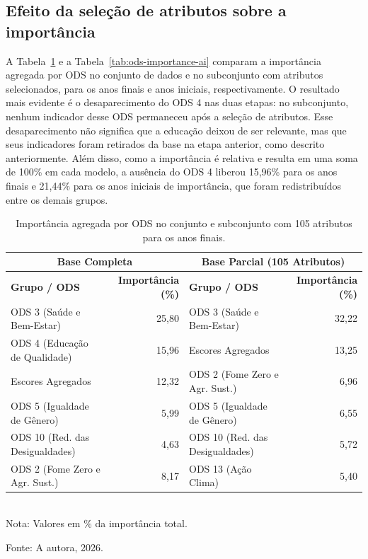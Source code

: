 \subsection{Efeito da seleção de atributos sobre a importância}

A Tabela~\ref{tab:ods-importance-af} e a Tabela~\ref{tab:ods-importance-ai} comparam a importância agregada por ODS no conjunto de dados e no subconjunto com atributos selecionados, para os anos finais e anos iniciais, respectivamente. O resultado mais evidente é o desaparecimento do ODS 4 nas duas etapas: no subconjunto, nenhum indicador desse ODS permaneceu após a seleção de atributos. Esse desaparecimento não significa que a educação deixou de ser relevante, mas que seus indicadores foram retirados da base na etapa anterior, como descrito anteriormente. Além disso, como a importância é relativa e resulta em uma soma de 100\% em cada modelo, a ausência do ODS 4 liberou 15,96\% para os anos finais e 21,44\% para os anos iniciais de importância, que foram redistribuídos entre os demais grupos.

\begin{table}[htbp]
	\centering
	\caption{Importância agregada por ODS no conjunto e subconjunto com 105 atributos para os anos finais.}
	\label{tab:ods-importance-af}
	\small
	\renewcommand{\arraystretch}{1.3}
	\setlength{\belowcaptionskip}{6pt}
	\begin{tabularx}{\textwidth}{|X|r|X|r|}
		\hline
		\multicolumn{2}{|c|}{\textbf{Base Completa}} & \multicolumn{2}{c|}{\textbf{Base Parcial (105 Atributos)}} \\
		\hline
		\textbf{Grupo / ODS} & \textbf{Importância (\%)} & \textbf{Grupo / ODS} & \textbf{Importância (\%)} \\
		\hline
		ODS 3 (Saúde e Bem-Estar) & 25,80 & ODS 3 (Saúde e Bem-Estar) & 32,22 \\
		ODS 4 (Educação de Qualidade) & 15,96 & Escores Agregados & 13,25 \\
		Escores Agregados & 12,32 & ODS 2 (Fome Zero e Agr. Sust.) & 6,96 \\
		ODS 5 (Igualdade de Gênero) & 5,99 & ODS 5 (Igualdade de Gênero) & 6,55 \\
		ODS 10 (Red. das Desigualdades) & 4,63 & ODS 10 (Red. das Desigualdades) & 5,72 \\
		ODS 2 (Fome Zero e Agr. Sust.) & 8,17 & ODS 13 (Ação Clima) & 5,40 \\
		\hline
	\end{tabularx}
	\\[4pt]
	\footnotesize{Nota: Valores em \% da importância total.}
	
	\vspace{2pt}
	\footnotesize{Fonte: A autora, 2026.}
\end{table}

